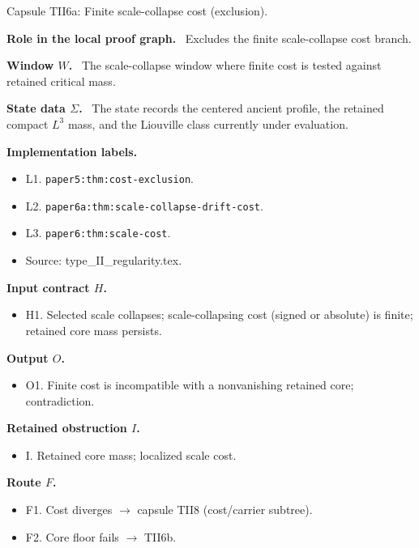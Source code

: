 \documentclass[11pt]{amsart}
\newcommand{\capsulefield}[1]{\par\smallskip\noindent\textbf{#1.}\ }
\begin{document}
\begin{proofcapsule}{Capsule TII6a: Finite scale-collapse cost (exclusion).}
  \capsulefield{Role in the local proof graph}
  Excludes the finite scale-collapse cost branch.

  \capsulefield{Window \(W\)}
The scale-collapse window where finite cost is tested against retained critical mass.

  \capsulefield{State data \(\Sigma\)}
The state records the centered ancient profile, the retained compact $L^3$ mass, and the Liouville class currently under evaluation.

  \capsulefield{Implementation labels}
  \begin{itemize}[leftmargin=1.8em]
  \item L1. \texttt{paper5:thm:cost-exclusion}.
  \item L2. \texttt{paper6a:thm:scale-collapse-drift-cost}.
  \item L3. \texttt{paper6:thm:scale-cost}.
  \item Source: type\_II\_regularity.tex.
  \end{itemize}

  \capsulefield{Input contract \(H\)}
  \begin{itemize}[leftmargin=1.8em]
  \item H1. Selected scale collapses; scale-collapsing cost (signed or absolute) is finite; retained core mass persists.
  \end{itemize}

  \capsulefield{Output \(O\)}
  \begin{itemize}[leftmargin=1.8em]
  \item O1. Finite cost is incompatible with a nonvanishing retained core; contradiction.
  \end{itemize}

  \capsulefield{Retained obstruction \(I\)}
  \begin{itemize}[leftmargin=1.8em]
  \item I. Retained core mass; localized scale cost.
  \end{itemize}

  \capsulefield{Route \(F\)}
  \begin{itemize}[leftmargin=1.8em]
  \item F1. Cost diverges $\to$ capsule TII8 (cost/carrier subtree).
  \item F2. Core floor fails $\to$ TII6b.
  \end{itemize}


\end{proofcapsule}
\end{document}
